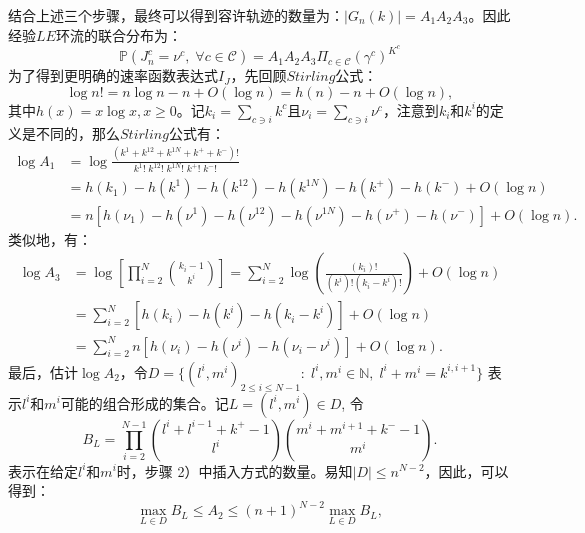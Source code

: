 结合上述三个步骤，最终可以得到容许轨迹的数量为：$|G_n(k)|=A_1A_2A_3$。因此经验$LE$环流的联合分布为：
\begin{equation} \label{trajectories}
    \mathbb{P}\left(J^c_n=\nu^c,\;\forall c\in\mathcal{C}\right)
    = A_1 A_2 A_3 \Pi_{c\in\mathcal{C}} (\gamma^c)^{K^c}
\end{equation}
为了得到更明确的速率函数表达式$I_J$，先回顾$Stirling$公式：
\begin{equation*}
    \log n! = n\log n-n+O(\log n)=h(n)-n+O(\log n),
\end{equation*}
其中$h(x)=x \log x, x \geqslant 0$。记$k_i=\sum_{c\ni i}k^c$且$\nu_i=\sum_{c\ni i}\nu^c$，注意到$k_i$和$k^i$的定义是不同的，那么$Stirling$公式有：
\begin{equation}\label{log A1}
    \begin{split}
    \log A_1&=\log\frac{(k^1+k^{12}+k^{1N}+k^{+}+k^{-})!}{k^1!\;k^{12}!\;k^{1N}!\;k^{+}!\;k^{-}!}\\
    &= h(k_1)-h(k^1)-h(k^{12})-h(k^{1N})-h(k^+)-h(k^-)+O(\log n)\\
    &= n\left[h(\nu_1)-h(\nu^1)-h(\nu^{12})-h(\nu^{1N})-h(\nu^+)-h(\nu^-)\right]+O(\log n).
    \end{split}
\end{equation}
类似地，有：
\begin{equation}\label{log A3}
    \begin{split}
    \log A_3&=\log\left[\prod_{i=2}^N\binom{k_i-1}{k^{i}}\right]
    =\sum_{i=2}^N\log\left(\frac{\left(k_i\right)!}{\left(k^i\right)!\left(k_i-k^i\right)!}\right)+O(\log n)\\
    &=\sum_{i=2}^N\left[h(k_i)-h(k^i)-h(k_i-k^i)\right]+O(\log n)\\
    &=\sum_{i=2}^Nn\left[h(\nu_i )-h(\nu^i)-h(\nu_i-\nu^i)\right]+O(\log n).
    \end{split}
\end{equation}
最后，估计$\log A_2$，令$D = \{(l^i,m^i)_{2\le i\le N-1}:\;l^i,m^i\in\mathbb{N},\;l^i+m^i=k^{i,i+1}\}$ 表示$l^i$和$m^i$可能的组合形成的集合。记$L = (l^i,m^i)\in D$, 令
\begin{equation*}
    B_L=\prod_{i=2}^{N-1}\binom{l^{i}+l^{i-1}+k^{+}-1}{l^{i}}\binom{m^{i}+m^{i+1}+k^{-}-1}{m^{i}}.
\end{equation*}
表示在给定$l^i$和$m^i$时，步骤 2）中插入方式的数量。易知$|D| \leqslant n^{N-2}$，因此，可以得到：
\begin{equation}\label{inequality}
    \max_{L\in D}B_L \le A_2 \le (n+1)^{N-2} \max_{L\in D}B_L,
\end{equation}
